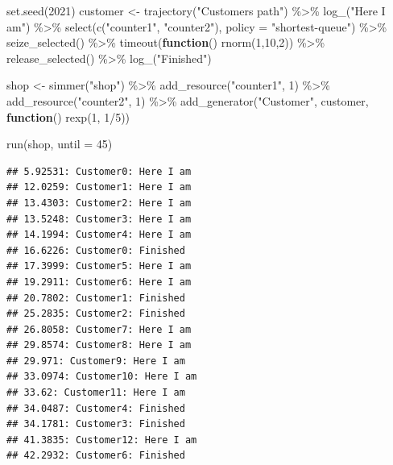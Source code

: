 \documentclass[
]{book}
\newenvironment{Shaded}{\begin{snugshade}}{\end{snugshade}}
\newcommand{\AttributeTok}[1]{\textcolor[rgb]{0.77,0.63,0.00}{#1}}
\newcommand{\ControlFlowTok}[1]{\textcolor[rgb]{0.13,0.29,0.53}{\textbf{#1}}}
\newcommand{\DecValTok}[1]{\textcolor[rgb]{0.00,0.00,0.81}{#1}}
\newcommand{\FunctionTok}[1]{\textcolor[rgb]{0.00,0.00,0.00}{#1}}
\newcommand{\NormalTok}[1]{#1}
\newcommand{\OtherTok}[1]{\textcolor[rgb]{0.56,0.35,0.01}{#1}}
\newcommand{\SpecialCharTok}[1]{\textcolor[rgb]{0.00,0.00,0.00}{#1}}
\newcommand{\StringTok}[1]{\textcolor[rgb]{0.31,0.60,0.02}{#1}}
\begin{document}
\begin{Shaded}
\begin{Highlighting}[]
\FunctionTok{set.seed}\NormalTok{(}\DecValTok{2021}\NormalTok{)}
\NormalTok{customer }\OtherTok{\textless{}{-}}
  \FunctionTok{trajectory}\NormalTok{(}\StringTok{"Customer\textquotesingle{}s path"}\NormalTok{) }\SpecialCharTok{\%\textgreater{}\%}
  \FunctionTok{log\_}\NormalTok{(}\StringTok{"Here I am"}\NormalTok{) }\SpecialCharTok{\%\textgreater{}\%}
  \FunctionTok{select}\NormalTok{(}\FunctionTok{c}\NormalTok{(}\StringTok{"counter1"}\NormalTok{, }\StringTok{"counter2"}\NormalTok{), }\AttributeTok{policy =} \StringTok{"shortest{-}queue"}\NormalTok{) }\SpecialCharTok{\%\textgreater{}\%}
  \FunctionTok{seize\_selected}\NormalTok{() }\SpecialCharTok{\%\textgreater{}\%}
  \FunctionTok{timeout}\NormalTok{(}\ControlFlowTok{function}\NormalTok{() }\FunctionTok{rnorm}\NormalTok{(}\DecValTok{1}\NormalTok{,}\DecValTok{10}\NormalTok{,}\DecValTok{2}\NormalTok{)) }\SpecialCharTok{\%\textgreater{}\%}
  \FunctionTok{release\_selected}\NormalTok{() }\SpecialCharTok{\%\textgreater{}\%}
   \FunctionTok{log\_}\NormalTok{(}\StringTok{"Finished"}\NormalTok{)}

\NormalTok{shop }\OtherTok{\textless{}{-}}
  \FunctionTok{simmer}\NormalTok{(}\StringTok{"shop"}\NormalTok{) }\SpecialCharTok{\%\textgreater{}\%}
  \FunctionTok{add\_resource}\NormalTok{(}\StringTok{"counter1"}\NormalTok{, }\DecValTok{1}\NormalTok{) }\SpecialCharTok{\%\textgreater{}\%}
  \FunctionTok{add\_resource}\NormalTok{(}\StringTok{"counter2"}\NormalTok{, }\DecValTok{1}\NormalTok{) }\SpecialCharTok{\%\textgreater{}\%}
  \FunctionTok{add\_generator}\NormalTok{(}\StringTok{"Customer"}\NormalTok{, customer, }\ControlFlowTok{function}\NormalTok{() }\FunctionTok{rexp}\NormalTok{(}\DecValTok{1}\NormalTok{, }\DecValTok{1}\SpecialCharTok{/}\DecValTok{5}\NormalTok{))}

\FunctionTok{run}\NormalTok{(shop, }\AttributeTok{until =} \DecValTok{45}\NormalTok{)}
\end{Highlighting}
\end{Shaded}

\begin{verbatim}
## 5.92531: Customer0: Here I am
## 12.0259: Customer1: Here I am
## 13.4303: Customer2: Here I am
## 13.5248: Customer3: Here I am
## 14.1994: Customer4: Here I am
## 16.6226: Customer0: Finished
## 17.3999: Customer5: Here I am
## 19.2911: Customer6: Here I am
## 20.7802: Customer1: Finished
## 25.2835: Customer2: Finished
## 26.8058: Customer7: Here I am
## 29.8574: Customer8: Here I am
## 29.971: Customer9: Here I am
## 33.0974: Customer10: Here I am
## 33.62: Customer11: Here I am
## 34.0487: Customer4: Finished
## 34.1781: Customer3: Finished
## 41.3835: Customer12: Here I am
## 42.2932: Customer6: Finished
\end{verbatim}
\end{document}
